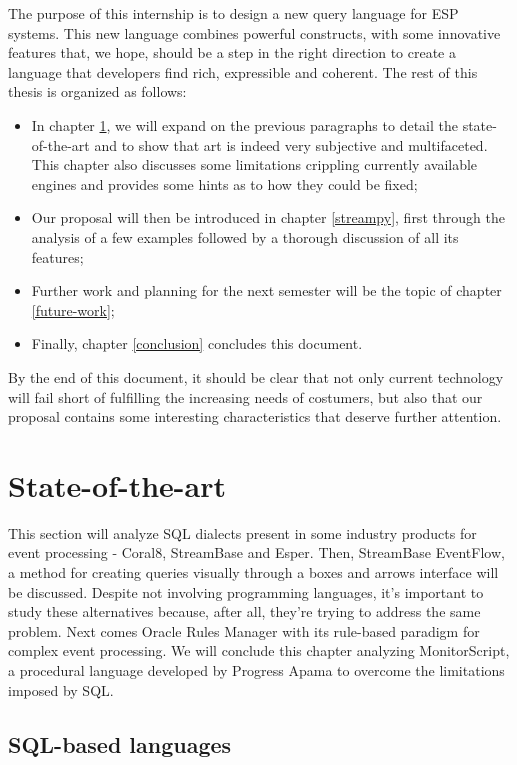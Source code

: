 \documentclass{report}
\begin{document}
The purpose of this internship is to design a new query language for ESP systems. This new language combines powerful constructs, with some innovative features that, we hope, should be a step in the right direction to create a language that developers find rich, expressible and coherent. The rest of this thesis is organized as follows:

\begin{itemize}
\item In chapter \ref{state-of-the-art}, we will expand on the previous paragraphs to detail the state-of-the-art and to show that art is indeed very subjective and multifaceted. This chapter also discusses some limitations crippling currently available engines and provides some hints as to how they could be fixed;
\item Our proposal will then be introduced in chapter \ref{streampy}, first through the analysis of a few examples followed by a thorough discussion of all its features;
\item Further work and planning for the next semester will be the topic of chapter \ref{future-work};
\item Finally, chapter \ref{conclusion} concludes this document.
\end{itemize}

By the end of this document, it should be clear that not only current technology will fail short of fulfilling the increasing needs of costumers, but also that our proposal contains some interesting characteristics that deserve further attention.

\chapter{State-of-the-art}
\label{state-of-the-art}

This section will analyze SQL dialects present in some industry products for event processing - Coral8, StreamBase and Esper. Then, StreamBase EventFlow, a method for creating queries visually through a boxes and arrows interface will be discussed. Despite not involving programming languages, it's important to study these alternatives because, after all, they're trying to address the same problem. Next comes Oracle Rules Manager with its rule-based paradigm for complex event processing. We will conclude this chapter analyzing MonitorScript, a procedural language developed by Progress Apama to overcome the limitations imposed by SQL.

\section{SQL-based languages}
\end{document}
